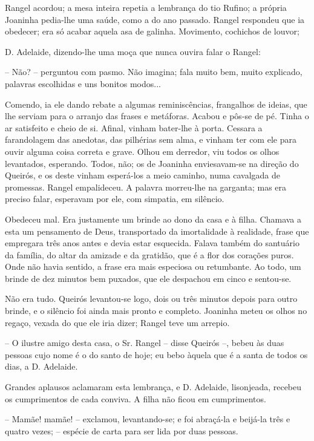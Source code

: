 Rangel acordou; a mesa inteira repetia a lembrança do tio Rufino; a
própria Joaninha pedia-lhe uma saúde, como a do ano passado. Rangel
respondeu que ia obedecer; era só acabar aquela asa de galinha.
Movimento, cochichos de louvor;

D. Adelaide, dizendo-lhe uma moça que nunca ouvira falar o Rangel:

-- Não? -- perguntou com pasmo. Não imagina; fala muito bem, muito
explicado, palavras escolhidas e uns bonitos modos...

Comendo, ia ele dando rebate a algumas reminiscências, frangalhos de
ideias, que lhe serviam para o arranjo das frases e metáforas. Acabou e
pôs-se de pé. Tinha o ar satisfeito e cheio de si. Afinal, vinham
bater-lhe à porta. Cessara a farandolagem das anedotas, das pilhérias
sem alma, e vinham ter com ele para ouvir alguma coisa correta e grave.
Olhou em derredor, viu todos os olhos levantados, esperando. Todos, não;
os de Joaninha enviesavam-se na direção do Queirós, e os deste vinham
esperá-los a meio caminho, numa cavalgada de promessas. Rangel
empalideceu. A palavra morreu-lhe na garganta; mas era preciso falar,
esperavam por ele, com simpatia, em silêncio.

Obedeceu mal. Era justamente um brinde ao dono da casa e à filha.
Chamava a esta um pensamento de Deus, transportado da imortalidade à
realidade, frase que empregara três anos antes e devia estar esquecida.
Falava também do santuário da família, do altar da amizade e da
gratidão, que é a flor dos corações puros. Onde não havia sentido, a
frase era mais especiosa ou retumbante. Ao todo, um brinde de dez
minutos bem puxados, que ele despachou em cinco e sentou-se.

Não era tudo. Queirós levantou-se logo, dois ou três minutos depois para
outro brinde, e o silêncio foi ainda mais pronto e completo. Joaninha
meteu os olhos no regaço, vexada do que ele iria dizer; Rangel teve um
arrepio.

-- O ilustre amigo desta casa, o Sr. Rangel -- disse Queirós --, bebeu
às duas pessoas cujo nome é o do santo de hoje; eu bebo àquela que é a
santa de todos os dias, a D. Adelaide.

Grandes aplausos aclamaram esta lembrança, e D. Adelaide, lisonjeada,
recebeu os cumprimentos de cada conviva. A filha não ficou em
cumprimentos.

-- Mamãe! mamãe! -- exclamou, levantando-se; e foi abraçá-la e beijá-la
três e quatro vezes; -- espécie de carta para ser lida por duas pessoas.

